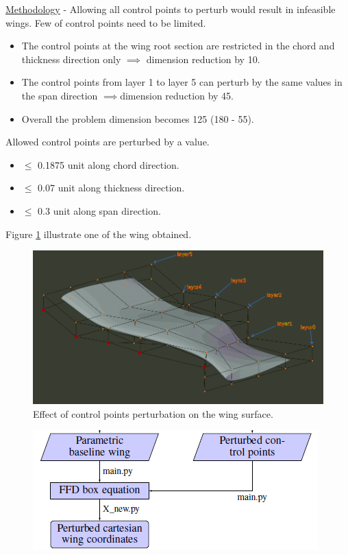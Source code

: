 \begin{frame}[allowframebreaks]{\underline{Methodology} -}
Allowing all control points to perturb would result in infeasible wings. Few of control points need to be limited.


\begin{itemize}
\item The control points at the wing root section are restricted in the chord and thickness direction only $\implies$ dimension reduction by 10.
\item The control points from layer 1 to layer 5 can perturb by the same values in the span direction $\implies$dimension reduction by 45.
\item Overall the problem dimension becomes 125 (180 - 55).
\end{itemize}
 
 Allowed control points are perturbed by a value.
\begin{itemize}
\item  $\leq$ 0.1875 unit along chord direction.
\item  $\leq$ 0.07 unit along thickness direction.
\item  $\leq$ 0.3 unit along span direction.
\end{itemize}
\newpage
Figure  \ref{ffd_box_perturbed} illustrate one of the wing obtained.
\parbox{0.47\linewidth}{
\begin{figure}
    \centering
    \includegraphics[scale=0.15]{figures/wing_FFD-_displaced.png}
    \caption{Effect of control points perturbation on the wing surface.}
    \label{ffd_box_perturbed}
\end{figure}
}
\parbox{0.47\linewidth}{
\begin{figure}
    \centering
    \includegraphics[scale=0.3]{figures/ffd_box_equation.png}

\end{figure}}
\end{frame}
